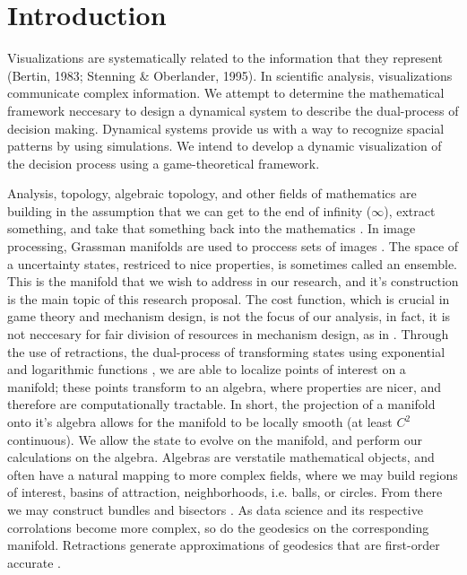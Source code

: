 \section{Introduction}
\label{sec:Introduction}


Visualizations are systematically related to the information that they represent 
(Bertin, 1983; Stenning \& Oberlander, 1995).
In scientific analysis, visualizations communicate complex information. We
attempt to determine the mathematical framework neccesary to design a dynamical
system to describe the dual-process of decision making. Dynamical systems provide us with
a way to recognize spacial patterns by using simulations. We intend to develop a
dynamic visualization of the decision process using a game-theoretical
framework. 

Analysis, topology, algebraic topology, and other fields of mathematics are building
in
the assumption that we can get to the end of infinity ($\infty$), extract
something, and take that something back into the mathematics \citep{NJ}.
In image processing, Grassman manifolds are used to proccess
sets of images \citep{MIC}. The space of a uncertainty states, restriced to nice
properties, is sometimes called an ensemble. This is the manifold that we wish to
address in our research, and it's construction is the main topic of this research proposal.
The cost function, which is crucial in game theory and mechanism design,
is not the focus of our analysis, in fact, it is not neccesary for fair
division of resources in mechanism design, as in \citep{MECH}. 
Through the use of retractions, the dual-process of transforming states using
exponential and logarithmic functions \citep{RMANI}, 
we are able to localize points of
interest on a manifold; these points transform to an algebra, where
properties are nicer, and therefore are computationally tractable. In
short, the projection of a manifold onto it's algebra allows for the
manifold to be locally smooth (at least $C^2$ continuous). We allow the
state to evolve on the manifold, and perform our calculations on the
algebra. Algebras are verstatile mathematical objects, and often
have a natural mapping to more complex fields, where we may build
regions of interest, basins of attraction, neighborhoods, i.e. balls, or
circles. From there we may construct bundles and bisectors \citep{NJ}. As
data science and its respective corrolations become more complex, so do
the geodesics on the corresponding manifold. Retractions generate approximations
of geodesics that are first-order accurate \citep{RMANI}.

